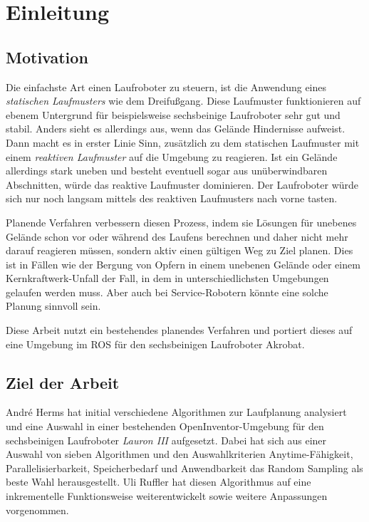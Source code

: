 \chapter{Einleitung}
\label{kap1}

\section{Motivation}

Die einfachste Art einen Laufroboter zu steuern, ist die Anwendung eines \emph{statischen Laufmusters} wie dem Dreifußgang. Diese Laufmuster funktionieren auf ebenem Untergrund für beispielsweise sechsbeinige Laufroboter sehr gut und stabil. Anders sieht es allerdings aus, wenn das Gelände Hindernisse aufweist. Dann macht es in erster Linie Sinn, zusätzlich zu dem statischen Laufmuster mit einem \emph{reaktiven Laufmuster} auf die Umgebung zu reagieren. Ist ein Gelände allerdings stark uneben und besteht eventuell sogar aus unüberwindbaren Abschnitten, würde das reaktive Laufmuster dominieren. Der Laufroboter würde sich nur noch langsam mittels des reaktiven Laufmusters nach vorne tasten.

Planende Verfahren verbessern diesen Prozess, indem sie Lösungen für unebenes Gelände schon vor oder während des Laufens berechnen und daher nicht mehr darauf reagieren müssen, sondern aktiv einen gültigen Weg zu Ziel planen. Dies ist in Fällen wie der Bergung von Opfern in einem unebenen Gelände oder einem Kernkraftwerk-Unfall der Fall, in dem in unterschiedlichsten Umgebungen gelaufen werden muss. Aber auch bei Service-Robotern könnte eine solche Planung sinnvoll sein.

Diese Arbeit nutzt ein bestehendes planendes Verfahren und portiert dieses auf eine Umgebung im \ac{ROS} für den sechsbeinigen Laufroboter Akrobat.

\section{Ziel der Arbeit}

André Herms \autocite{herms2004} hat initial verschiedene Algorithmen zur Laufplanung analysiert und eine Auswahl in einer bestehenden OpenInventor-Umgebung \autocite{inventor} für den sechsbeinigen Laufroboter \emph{Lauron III} aufgesetzt. Dabei hat sich aus einer Auswahl von sieben Algorithmen und den Auswahlkriterien Anytime-Fähigkeit, Parallelisierbarkeit, Speicherbedarf und Anwendbarkeit das Random Sampling als beste Wahl herausgestellt. Uli Ruffler \autocite{ruffler2006} hat diesen Algorithmus auf eine inkrementelle Funktionsweise weiterentwickelt sowie weitere Anpassungen vorgenommen.

